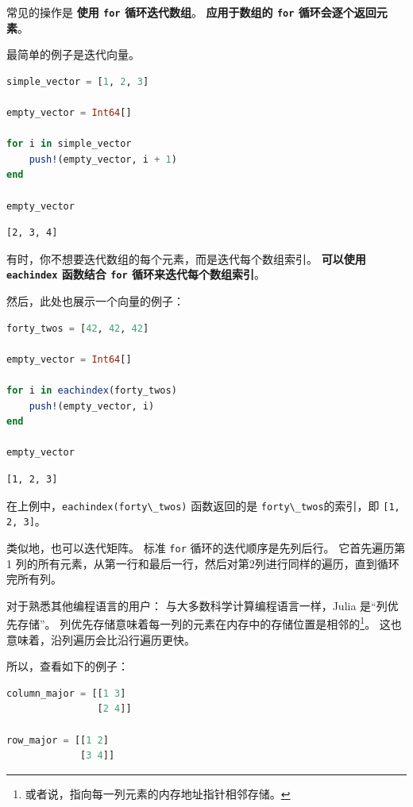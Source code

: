 \documentclass[
  notoc %
]{tufte-book}
\newcommand{\passthrough}[1]{#1}
\begin{document}
常见的操作是 \textbf{使用 \passthrough{\lstinline!for!} 循环迭代数组}。
\textbf{应用于数组的 \passthrough{\lstinline!for!} 循环会逐个返回元素}。

最简单的例子是迭代向量。

\begin{lstlisting}[language=Julia]
simple_vector = [1, 2, 3]

empty_vector = Int64[]

for i in simple_vector
    push!(empty_vector, i + 1)
end

empty_vector
\end{lstlisting}

\begin{lstlisting}[language=Output]
[2, 3, 4]
\end{lstlisting}

有时，你不想要迭代数组的每个元素，而是迭代每个数组索引。
\textbf{可以使用 \passthrough{\lstinline!eachindex!} 函数结合
\passthrough{\lstinline!for!} 循环来迭代每个数组索引}。

然后，此处也展示一个向量的例子：

\begin{lstlisting}[language=Julia]
forty_twos = [42, 42, 42]

empty_vector = Int64[]

for i in eachindex(forty_twos)
    push!(empty_vector, i)
end

empty_vector
\end{lstlisting}

\begin{lstlisting}[language=Output]
[1, 2, 3]
\end{lstlisting}

在上例中，\passthrough{\lstinline!eachindex(forty\_twos)!} 函数返回的是
\passthrough{\lstinline!forty\_twos!}的索引，即
\passthrough{\lstinline![1, 2, 3]!}。

类似地，也可以迭代矩阵。 标准 \passthrough{\lstinline!for!}
循环的迭代顺序是先列后行。 它首先遍历第 1
列的所有元素，从第一行和最后一行，然后对第2列进行同样的遍历，直到循环完所有列。

对于熟悉其他编程语言的用户： 与大多数科学计算编程语言一样，Julia
是``列优先存储''。
列优先存储意味着每一列的元素在内存中的存储位置是相邻的\footnote{或者说，指向每一列元素的内存地址指针相邻存储。}。
这也意味着，沿列遍历会比沿行遍历更快。

所以，查看如下的例子：

\begin{lstlisting}[language=Julia]
column_major = [[1 3]
                [2 4]]

row_major = [[1 2]
             [3 4]]
\end{lstlisting}
\end{document}
